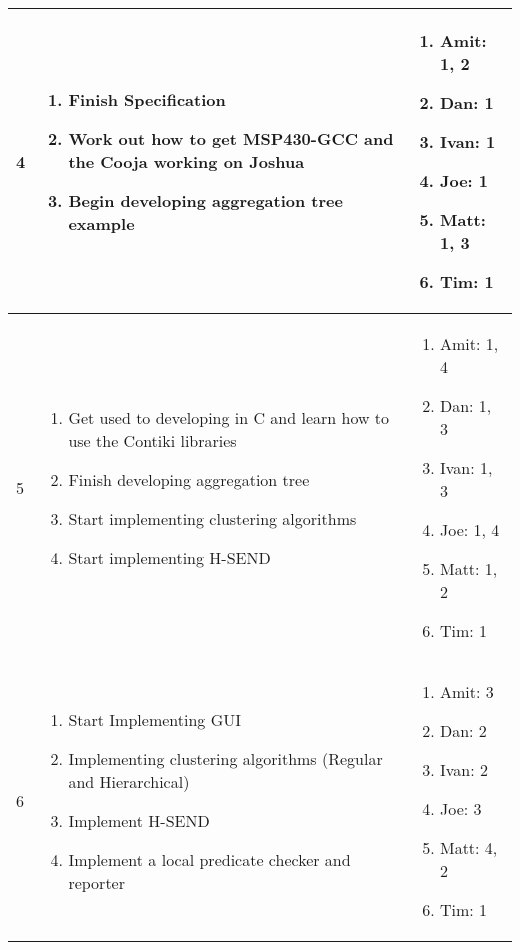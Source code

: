 \begin{center}
\begin{longtable}{| l | p{7.5cm} | p{5cm} |}
	
	4 & \begin{enumerate}
			\item Finish Specification
			\item Work out how to get MSP430-GCC and the Cooja working on Joshua
			\item Begin developing aggregation tree example
		\end{enumerate} &
	\begin{enumerate}
		\item[] Amit: 1, 2
		\item[] Dan: 1
		\item[] Ivan: 1
		\item[] Joe: 1
		\item[] Matt: 1, 3
		\item[] Tim: 1
	\end{enumerate}
	\\ \hline
	
	
	5 & \begin{enumerate}
			\item Get used to developing in C and learn how to use the Contiki libraries
			\item Finish developing aggregation tree
			\item Start implementing clustering algorithms
			\item Start implementing H-SEND
		\end{enumerate} &
	\begin{enumerate}
		\item[] Amit: 1, 4
		\item[] Dan: 1, 3
		\item[] Ivan: 1, 3
		\item[] Joe: 1, 4
		\item[] Matt: 1, 2
		\item[] Tim: 1
	\end{enumerate}
	\\ \hline
	
	
	6 & \begin{enumerate}
			\item Start Implementing GUI
			\item Implementing clustering algorithms (Regular and Hierarchical)
			\item Implement H-SEND
			\item Implement a local predicate checker and reporter
		\end{enumerate} &
	\begin{enumerate}
		\item[] Amit: 3
		\item[] Dan: 2
		\item[] Ivan: 2
		\item[] Joe: 3
		\item[] Matt: 4, 2
		\item[] Tim: 1
	\end{enumerate}
	\\ \hline
	

\end{longtable}
\end{center}
